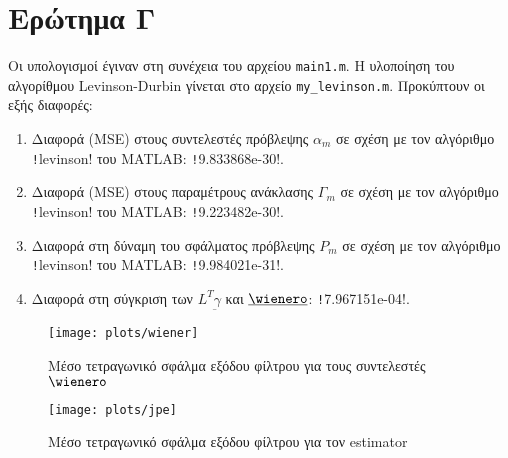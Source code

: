 \section{Ερώτημα Γ}\label{section:C}
Οι υπολογισμοί έγιναν στη συνέχεια του αρχείου \texttt{main1.m}.
Η υλοποίηση του αλγορίθμου Levinson-Durbin γίνεται στο αρχείο \texttt{my_levinson.m}.
Προκύπτουν οι εξής διαφορές:
\begin{enumerate}
\item Διαφορά (MSE) στους συντελεστές πρόβλεψης $\alpha_m$ σε σχέση με τον αλγόριθμο \texttt!levinson! του MATLAB: \texttt!9.833868e-30!.
\item Διαφορά (MSE) στους παραμέτρους ανάκλασης $\Gamma_m$ σε σχέση με τον αλγόριθμο \texttt!levinson! του MATLAB: \texttt!9.223482e-30!.
\item Διαφορά στη δύναμη του σφάλματος πρόβλεψης $P_m$ σε σχέση με τον αλγόριθμο \texttt!levinson! του MATLAB: \texttt!9.984021e-31!.
\item Διαφορά στη σύγκριση των $L^T \underbar{\gamma}$ και $\underbar{\wienero}$: \texttt!7.967151e-04!.
\end{enumerate}

\begin{figure}
\texttt{[image: plots/wiener]}
\caption{Μέσο τετραγωνικό σφάλμα εξόδου φίλτρου για τους συντελεστές $\wienero$}
\end{figure}
\begin{figure}
\texttt{[image: plots/jpe]}
\caption{Μέσο τετραγωνικό σφάλμα εξόδου φίλτρου για τον estimator}
\end{figure}
